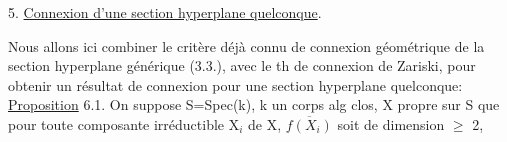


%
%

%






%




%



5. \uline{Connexion d'une section hyperplane quelconque}.

Nous allons ici combiner le critère déjà connu de connexion
géométrique de la section hyperplane générique  (3.3.), avec le
th de connexion de Zariski, pour obtenir un résultat de connexion pour
une section hyperplane quelconque:
\uline{Proposition} 6.1.  On suppose S=Spec(k), k un corps alg clos, X propre sur S 
que pour toute composante irréductible X$_{i}$ de X,  $\overline{f(X_{i})}$ soit de
dimension $\geqslant$ 2,  

